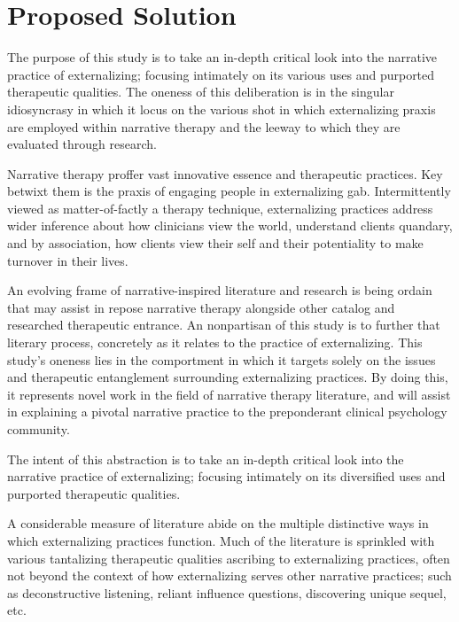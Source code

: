 \section{Proposed Solution}

The purpose of this study is to take an in-depth critical look into the narrative practice of externalizing; focusing intimately on its various uses and purported therapeutic qualities. The oneness of this deliberation is in the singular idiosyncrasy in which it locus on the various shot in which externalizing praxis are employed within narrative therapy and the leeway to which they are evaluated through research.

Narrative therapy proffer vast innovative essence and therapeutic practices. Key betwixt them is the praxis of engaging people in externalizing gab. Intermittently viewed as matter-of-factly a therapy technique, externalizing practices address wider inference about how clinicians view the world, understand clients quandary, and by association, how clients view their self and their potentiality to make turnover in their lives.

An evolving frame of narrative-inspired literature and research is being ordain that may assist in repose narrative therapy alongside other catalog and researched therapeutic entrance. An nonpartisan of this study is to further that literary process, concretely as it relates to the practice of externalizing. This study’s oneness lies in the comportment in which it targets solely on the issues and therapeutic entanglement surrounding externalizing practices. By doing this, it represents novel work in the field of narrative therapy literature, and will assist in explaining a pivotal narrative practice to the preponderant clinical psychology community.

The intent of this abstraction is to take an in-depth critical look into the narrative practice of externalizing; focusing intimately on its diversified uses and purported therapeutic qualities.

A considerable measure of literature abide on the multiple distinctive ways in which externalizing practices function. Much of the literature is sprinkled with various tantalizing therapeutic qualities ascribing to externalizing practices, often not beyond the context of how externalizing serves other narrative practices; such as deconstructive listening, reliant influence questions, discovering unique sequel, etc.

\pagebreak

